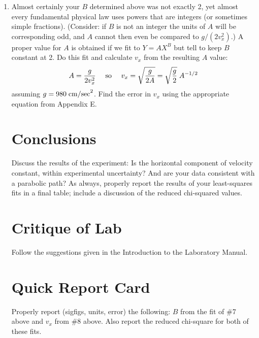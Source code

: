 \begin{enumerate}
\item Almost certainly your $B$ determined above was not exactly 2, yet
almost every fundamental physical law uses powers that are integers 
(or sometimes simple fractions). (Consider: if $B$ is not an integer the
units of $A$ will be corresponding odd, and $A$ cannot then even be
compared to $g/(2v_{x}^{2})$.)
A proper value for $A$ is obtained if we fit 
to $Y = AX^{B}$ but tell \WAPP to keep $B$ constant
at 2.    Do this fit and calculate $v_x$ from the resulting $A$ value:
\begin{equation}
A= {g\over 2v_{x}^{2}} \quad\mbox{ so } \quad v_x=\sqrt{g\over 2A} =\sqrt{g\over 2}\;A^{-1/2}
\end{equation}
assuming $g=980\;{\rm cm/sec}^2$.  Find the error in $v_x$ using the appropriate
equation from Appendix E.

\section*{Conclusions}

Discuss the results of the experiment:  Is the horizontal component of
velocity constant, within experimental uncertainty?  And are your data
consistent with a parabolic path?  As always, properly report the results
of your least-squares fits in a final table; include a discussion of the reduced
chi-squared values.

\section*{Critique of Lab}
     Follow the suggestions given in the Introduction to the
Laboratory Manual.

\section*{Quick Report Card}
Properly report (sigfigs, units, error) the following: $B$ from the fit of \#7 above and
$v_x$ from \#8 above.  Also report the reduced chi-square for both of these fits.


\end{enumerate}
\newpage
